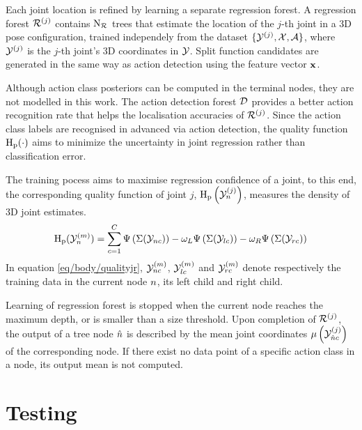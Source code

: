 Each joint location is refined by learning a separate regression forest.  
A regression forest $\mathcal{R}^{(j)}$ contains $\mathrm{N_{\mathcal{R}}}$ trees that estimate the location of the $j$-th joint in a 3D pose configuration, trained independely from the dataset $\{ \mathcal{Y}^{(j)}, \mathcal{X}, \mathcal{A}\}$, where $\mathcal{Y}^{(j)}$ is the $j$-th joint's 3D coordinates in $\mathcal{Y}$. 
Split function candidates are generated in the same way as action detection using the feature vector $\mathbf{x}$. 

Although action class posteriors can be computed in the terminal nodes, they are not modelled in this work. The action detection forest $\mathcal{D}$ provides a better action recognition rate that helps the localisation accuracies of $\mathcal{R}^{(j)}$. Since the action class labels are recognised in advanced via action detection, the quality function $\mathrm{H_{p}}(\cdot)$ aims to minimize the uncertainty in joint regression rather than classification error.

The training pocess aims to maximise regression confidence of a joint, to this end, the corresponding quality function of joint $j$, $\mathrm{H_{p}}\left(\mathcal{Y}^{(j)}_{n}\right)$, measures the density of 3D joint estimates.
\begin{equation}
	\label{eq/body/qualityjr}
	\mathrm{H_{p}}(\mathcal{Y}^{(m)}_{n}) = \displaystyle\sum_{c = 1}^{C} \Psi\left(\Sigma(\mathcal{Y}_{n c})\right) - \omega_{L}\Psi\left(\Sigma(\mathcal{Y}_{lc})\right) - \omega_{R}\Psi\left(\Sigma(\mathcal{Y}_{rc})\right)
\end{equation}
In equation \ref{eq/body/qualityjr}, $\mathcal{Y}^{(m)}_{n c}$, $\mathcal{Y}^{(m)}_{l c}$ and $\mathcal{Y}^{(m)}_{r c}$ denote respectively the training data in the current node $n$, its left child and right child.  

Learning of regression forest is stopped when the current node reaches the maximum depth, or is smaller than a size threshold.  
Upon completion of $\mathcal{R}^{(j)}$, the output of a tree node ${\hat{n}}$ is described by the mean joint coordinates $\mu\left(\mathcal{Y}^{(j)}_{{\hat{n}} c}\right)$ of the corresponding node. If there exist no data point of a specific action class in a node, its output mean is not computed.  

\section{Testing}

